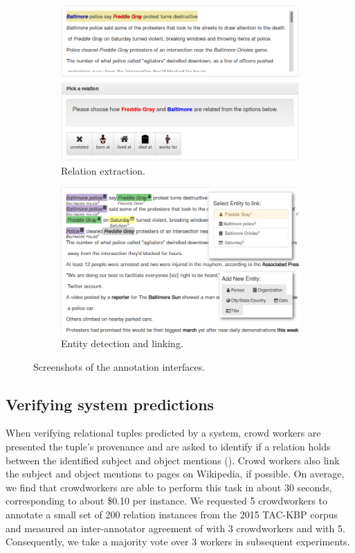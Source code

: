 \begin{figure}[t]
\begin{subfigure}{0.49\textwidth}
  \includegraphics[width=\textwidth]{figures/interface/relation-interface}
  \caption{\label{fig:relation-interface} Relation extraction.}
\end{subfigure}
\hfill
\begin{subfigure}{0.49\textwidth}
  \includegraphics[width=\textwidth]{figures/interface/extraction-interface}
  \caption{\label{fig:entity-interface} Entity detection and linking.}
\end{subfigure}
\caption{\label{fig:interfaces} Screenshots of the annotation interfaces.}
\end{figure}

\subsection{Verifying system predictions}
When verifying relational tuples predicted by a system, 
  crowd workers are presented the tuple's provenance and are asked to identify if a relation holds between the identified subject and object mentions (). 
  Crowd workers also link the subject and object mentions to pages on Wikipedia, if possible.
On average, we find that crowdworkers are able to perform this task in about 30 seconds, corresponding to about \$0.10 per instance.
We requested 5 crowdworkers to annotate a small set of 200 relation instances from the 2015 TAC-KBP corpus 
and measured an inter-annotator agreement of  with 3 crowdworkers and  with 5.
Consequently, we take a majority vote over 3 workers in subsequent experiments.

